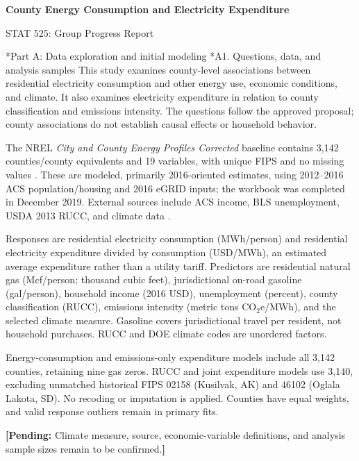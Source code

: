 \documentclass[11pt,letterpaper]{article}
\makeatletter
\renewcommand\section{\@startsection{section}{1}{0pt}{1.4ex plus .3ex minus .2ex}{.6ex}{\normalfont\large\bfseries}}
\renewcommand\subsection{\@startsection{subsection}{2}{0pt}{1.2ex plus .3ex minus .2ex}{.5ex}{\normalfont\normalsize\bfseries}}
\newcommand{\placeholder}[1]{\par{\small\color{blue!55!black}\textbf{[Pending:} #1\textbf{]}}\par}
\makeatother
\begin{document}
{\centering\large\bfseries County Energy Consumption and Electricity Expenditure\par}
{\centering\small STAT 525: Group Progress Report\par}\medskip
\section*{Part A: Data exploration and initial modeling}
\subsection*{A1. Questions, data, and analysis samples}
This study examines county-level associations between residential electricity consumption and other energy use, economic conditions, and climate. It also examines electricity expenditure in relation to county classification and emissions intensity. The questions follow the approved proposal; county associations do not establish causal effects or household behavior.

The NREL \emph{City and County Energy Profiles Corrected} baseline contains 3,142 counties/county equivalents and 19 variables, with unique FIPS and no missing values \cite{nrel}. These are modeled, primarily 2016-oriented estimates, using 2012--2016 ACS population/housing and 2016 eGRID inputs; the workbook was completed in December 2019. External sources include ACS income, BLS unemployment, USDA 2013 RUCC, and climate data \cite{external}.

Responses are residential electricity consumption (MWh/person) and residential electricity expenditure divided by consumption (USD/MWh), an estimated average expenditure rather than a utility tariff. Predictors are residential natural gas (Mcf/person; thousand cubic feet), jurisdictional on-road gasoline (gal/person), household income (2016 USD), unemployment (percent), county classification (RUCC), emissions intensity (metric tons CO$_2$e/MWh), and the selected climate measure. Gasoline covers jurisdictional travel per resident, not household purchases. RUCC and DOE climate codes are unordered factors.

Energy-consumption and emissions-only expenditure models include all 3,142 counties, retaining nine gas zeros. RUCC and joint expenditure models use 3,140, excluding unmatched historical FIPS 02158 (Kusilvak, AK) and 46102 (Oglala Lakota, SD). No recoding or imputation is applied. Counties have equal weights, and valid response outliers remain in primary fits.
\placeholder{Climate measure, source, economic-variable definitions, and analysis sample sizes remain to be confirmed.}
\end{document}
